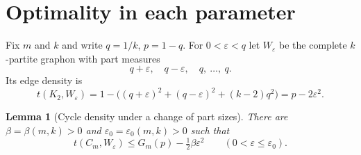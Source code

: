 \documentclass[11pt]{article}
\newtheorem{lemma}[theorem]{Lemma}
\theoremstyle{remark}
\begin{document}
\section{Optimality in each parameter}
\label{sec:sharpness}

Fix $m$ and $k$ and write $q=1/k$, $p=1-q$. For $0<\varepsilon<q$ let
$W_\varepsilon$ be the complete $k$-partite graphon with part measures
\[
 q+\varepsilon,\quad q-\varepsilon,\quad q,\ \ldots,\ q .
\]
Its edge density is
\begin{equation}\label{eq:unbalanced-edge}
 t(K_2,W_\varepsilon)
 =1-\bigl((q+\varepsilon)^2+(q-\varepsilon)^2+(k-2)q^2\bigr)
 =p-2\varepsilon^2 .
\end{equation}

\begin{lemma}[Cycle density under a change of part sizes]
\label{lem:expansion}
There are $\beta=\beta(m,k)>0$ and $\varepsilon_0=\varepsilon_0(m,k)>0$
such that
\begin{equation}\label{eq:unbalanced-cycle}
 t(C_m,W_\varepsilon)\leq G_m(p)-\tfrac12\beta\varepsilon^2
 \qquad(0<\varepsilon\leq\varepsilon_0).
\end{equation}
\end{lemma}
\end{document}
